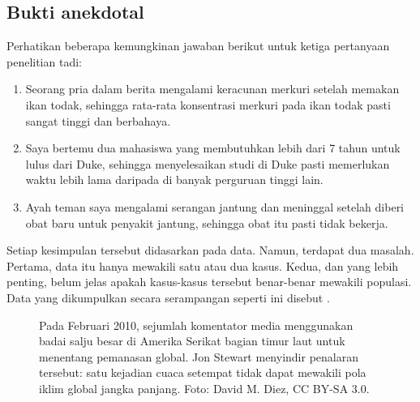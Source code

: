 \subsection{Bukti anekdotal}
\label{anecdotalEvidenceSubsection}


\noindent%
Perhatikan beberapa kemungkinan jawaban berikut untuk ketiga pertanyaan penelitian tadi:
\begin{enumerate}
\setlength{\itemsep}{0mm}
\item
    Seorang pria dalam berita mengalami keracunan merkuri setelah memakan
    ikan todak, sehingga rata-rata konsentrasi merkuri pada ikan todak pasti
    sangat tinggi dan berbahaya.
\item\label{iKnowThreeStudentsWhoTookMoreThan7YearsToGraduateAtDuke}
    Saya bertemu dua mahasiswa yang membutuhkan lebih dari 7 tahun untuk
    lulus dari Duke, sehingga menyelesaikan studi di Duke pasti memerlukan
    waktu lebih lama daripada di banyak perguruan tinggi lain.
\item\label{myFriendsDadDiedAfterSulphinpyrazon}
    Ayah teman saya mengalami serangan jantung dan meninggal setelah diberi
    obat baru untuk penyakit jantung, sehingga obat itu pasti tidak bekerja.
\end{enumerate}
Setiap kesimpulan tersebut didasarkan pada data.
Namun, terdapat dua masalah.
Pertama, data itu hanya mewakili satu atau dua kasus.
Kedua, dan yang lebih penting, belum jelas apakah kasus-kasus tersebut
benar-benar mewakili populasi.
Data yang dikumpulkan secara serampangan seperti ini disebut
.

\captionsetup{width=\textwidth-75mm}
\begin{figure}[h]
  \centering
  \hspace{8mm}\hspace{4mm}
  \begin{minipage}[b]{\textwidth-75mm}
    \caption[bukti anekdotal]{Pada Februari 2010,
        sejumlah komentator media menggunakan badai salju besar di Amerika
        Serikat bagian timur laut untuk menentang pemanasan global. Jon Stewart
        menyindir penalaran tersebut: satu kejadian cuaca setempat tidak dapat
        mewakili pola iklim global jangka panjang. Foto: David M. Diez,
        CC BY-SA 3.0.
    \label{mnWinter}}
  \end{minipage}
\end{figure}
\captionsetup{width=\mycaptionwidth}

